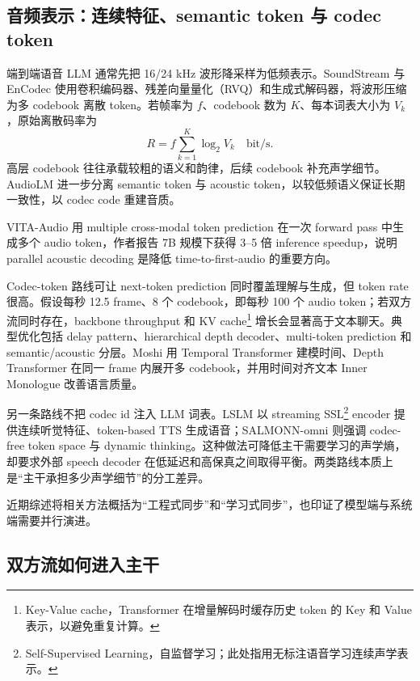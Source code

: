 \subsection{音频表示：连续特征、semantic token 与 codec token}

端到端语音 LLM 通常先把 16/24 kHz 波形降采样为低频表示。SoundStream 与 EnCodec 使用卷积编码器、残差向量量化（RVQ）和生成式解码器，将波形压缩为多 codebook 离散 token\cite{zeghidour2021soundstream,defossez2022encodec}。若帧率为 $f$、codebook 数为 $K$、每本词表大小为 $V_k$，原始离散码率为
\begin{equation}
R=f\sum_{k=1}^{K}\log_2V_k\quad\text{bit/s}.
\end{equation}
高层 codebook 往往承载较粗的语义和韵律，后续 codebook 补充声学细节。AudioLM 进一步分离 semantic token 与 acoustic token，以较低频语义保证长期一致性，以 codec code 重建音质\cite{borsos2022audiolm}。

VITA-Audio 用 multiple cross-modal token prediction 在一次 forward pass 中生成多个 audio token，作者报告 7B 规模下获得 3--5 倍 inference speedup\cite{long2025vitaaudio}，说明 parallel acoustic decoding 是降低 time-to-first-audio 的重要方向。

Codec-token 路线可让 next-token prediction 同时覆盖理解与生成，但 token rate 很高。假设每秒 12.5 frame、8 个 codebook，即每秒 100 个 audio token；若双方流同时存在，backbone throughput 和 KV cache\footnote{Key-Value cache，Transformer 在增量解码时缓存历史 token 的 Key 和 Value 表示，以避免重复计算。} 增长会显著高于文本聊天。典型优化包括 delay pattern、hierarchical depth decoder、multi-token prediction 和 semantic/acoustic 分层。Moshi 用 Temporal Transformer 建模时间、Depth Transformer 在同一 frame 内展开多 codebook，并用时间对齐文本 Inner Monologue 改善语言质量\cite{defossez2024moshi}。

另一条路线不把 codec id 注入 LLM 词表。LSLM 以 streaming SSL\footnote{Self-Supervised Learning，自监督学习；此处指用无标注语音学习连续声学表示。} encoder 提供连续听觉特征、token-based TTS 生成语音；SALMONN-omni 则强调 codec-free token space 与 dynamic thinking\cite{ma2025lslm,yu2025salmonnomni}。这种做法可降低主干需要学习的声学熵，却要求外部 speech decoder 在低延迟和高保真之间取得平衡。两类路线本质上是“主干承担多少声学细节”的分工差异。

近期综述将相关方法概括为“工程式同步”和“学习式同步”，也印证了模型端与系统端需要并行演进\cite{chen2025survey}。

\subsection{双方流如何进入主干}

